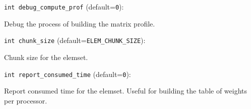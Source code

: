 \item\verb+int debug_compute_prof+ {\rm(default=\verb|0|)}:

Debug the process of building the matrix profile. 

\item\verb+int chunk_size+ {\rm(default=\verb|ELEM_CHUNK_SIZE|)}:

Chunk size for the elemset. 

\item\verb+int report_consumed_time+ {\rm(default=\verb|0|)}:

Report consumed time for the elemset. Useful for building
the table of weights per processor. 


